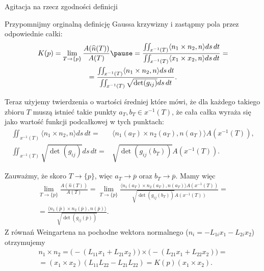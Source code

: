 \begin{frame}[<+->]{Agitacja na rzecz zgodności definicji}



\pause Przypomnijmy orginalną definicję Gaussa krzywizny i zastąpmy pola przez odpowiednie całki:
\begin{multline*}
K(p)=\lim_{T\to \{p\}}\frac{A(\widehat{n}(T))}{A(T)}\pause =\frac{\iint_{x^{-1}(T)}\langle n_1\times n_2, n\rangle ds\,dt}{\iint_{x^{-1}(T)}\langle x_1\times x_2, n\rangle ds\,dt}=\\=\frac{\iint_{x^{-1}(T)}\langle n_1\times n_2, n\rangle ds\,dt}{\iint_{x^{-1}(T)}\sqrt{\det(g_{ij}) } ds\,dt}. 
\end{multline*}
\end{frame}
\begin{frame}[<+->]
Teraz użyjemy twierdzenia o wartości średniej które mówi, że dla każdego takiego zbioru $T$ muszą istnieć takie punkty $a_T,b_T\in x^{-1}(T)$, że cała całka wyraża się jako wartość funkcji podcałkowej w tych punktach:
\pause \begin{align*}
\iint_{x^{-1}(T)}\langle n_1\times n_2, n\rangle ds\,dt=&\langle n_1(a_T)\times n_2(a_T),n(a_T)\rangle A(x^{-1}(T)),\\
\iint_{x^{-1}(T)}\sqrt{\det(g_{ij}) } ds\,dt=& \sqrt{\det(g_{ij}(b_T))}A(x^{-1}(T)).
\end{align*}

\end{frame}
\begin{frame}[<+->]


Zauważmy, że skoro $T\to \{p\}$, więc $a_T\to \overline{p}$ oraz $b_T\to \overline{p}$. \pause Mamy więc
\begin{multline*}
\lim_{T\to \{p\}}\frac{A(\widehat{n}(T))}{A(T)}=\lim_{T\to \{p\}}\frac{\langle n_1(a_T)\times n_2(a_T),n(a_T)\rangle A(x^{-1}(T))}{\sqrt{\det(g_{ij}(b_T))}A(x^{-1}(T))}=\\
=\frac{\langle n_1(\overline{p})\times n_2(\overline{p}),n(\overline{p})\rangle}{\sqrt{\det(g_{ij}(\overline{p}))}}.
\end{multline*}
\pause
Z równań Weingartena na pochodne wektora normalnego ($n_i=-L_{1i}x_1-L_{2i}x_2$) otrzymujemy
\begin{multline*}
 n_1\times n_2=\big(-(L_{11}x_1+L_{21}x_2)\big)\times\big(-(L_{21}x_1+L_{22}x_2)\big)=\\=(x_1\times x_2)(L_{11}L_{22}-L_{21}L_{22})=K(p)(x_1\times x_2).
\end{multline*}

\end{frame}
